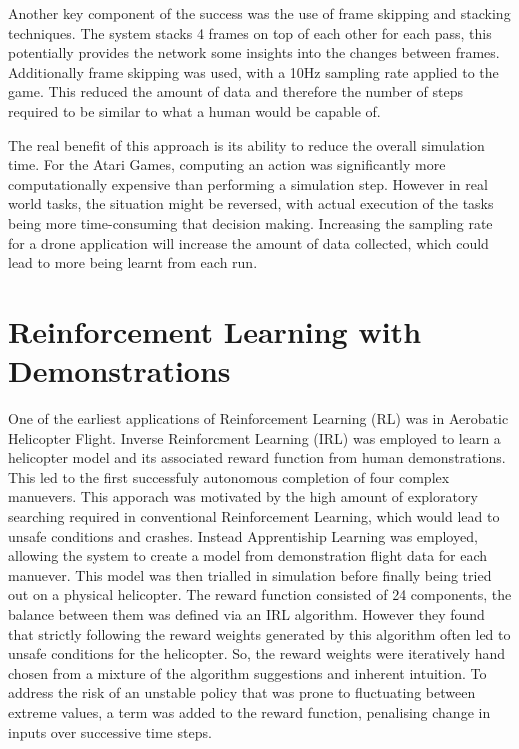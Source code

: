 Another key component of the success was the use of frame skipping and stacking techniques.
The system stacks 4 frames on top of each other for each pass, this potentially provides the network some insights into the changes between frames.
Additionally frame skipping was used, with a 10Hz sampling rate applied to the game.
This reduced the amount of data and therefore the number of steps required to be similar to what a human would be capable of.

The real benefit of this approach is its ability to reduce the overall simulation time.
For the Atari Games, computing an action was significantly more computationally expensive than performing a simulation step.
However in real world tasks, the situation might be reversed, with actual execution of the tasks being more time-consuming that decision making.
Increasing the sampling rate for a drone application will increase the amount of data collected, which could lead to more being learnt from each run.

\section{Reinforcement Learning with Demonstrations}

One of the earliest applications of Reinforcement Learning (RL) was in Aerobatic Helicopter Flight\cite{abbeelRLAerobaticFlight}.
Inverse Reinforcment Learning (IRL) was employed to learn a helicopter model and its associated reward function from human demonstrations.
This led to the first successfuly autonomous completion of four complex manuevers.
This apporach was motivated by the high amount of exploratory searching required in conventional Reinforcement Learning, which would lead to unsafe conditions and crashes.
Instead Apprentiship Learning was employed, allowing the system to create a model from demonstration flight data for each manuever.
This model was then trialled in simulation before finally being tried out on a physical helicopter.
The reward function consisted of 24 components, the balance between them was defined via an IRL algorithm.
However they found that strictly following the reward weights generated by this algorithm often led to unsafe conditions for the helicopter.
So, the reward weights were iteratively hand chosen from a mixture of the algorithm suggestions and inherent intuition. 
To address the risk of an unstable policy that was prone to fluctuating between extreme values, a term was added to the reward function, penalising change in inputs over successive time steps.

